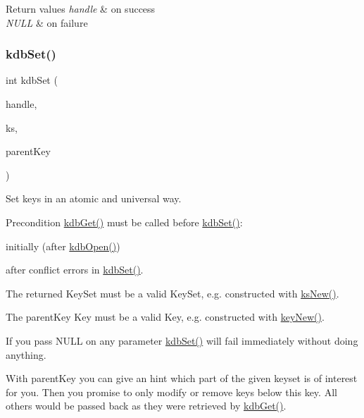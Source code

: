 \begin{DoxyRetVals}{Return values}
{\em handle} & on success \\
\hline
{\em N\+U\+LL} & on failure \\
\hline
\end{DoxyRetVals}
\mbox{\label{group__kdb_ga11436b058408f83d303ca5e996832bcf}} 
\subsubsection{\texorpdfstring{kdbSet()}{kdbSet()}}
{\footnotesize\ttfamily int kdb\+Set (\begin{DoxyParamCaption}\item[{K\+DB $\ast$}]{handle,  }\item[{Key\+Set $\ast$}]{ks,  }\item[{Key $\ast$}]{parent\+Key }\end{DoxyParamCaption})}



Set keys in an atomic and universal way. 

\begin{DoxyPrecond}{Precondition}
\mbox{\hyperlink{group__kdb_ga28e385fd9cb7ccfe0b2f1ed2f62453a1}{kdb\+Get()}} must be called before \mbox{\hyperlink{group__kdb_ga11436b058408f83d303ca5e996832bcf}{kdb\+Set()}}\+:
\begin{DoxyItemize}
\item initially (after \mbox{\hyperlink{group__kdb_ga6808defe5870f328dd17910aacbdc6ca}{kdb\+Open()}})
\item after conflict errors in \mbox{\hyperlink{group__kdb_ga11436b058408f83d303ca5e996832bcf}{kdb\+Set()}}.
\end{DoxyItemize}

The {\ttfamily returned} Key\+Set must be a valid Key\+Set, e.\+g. constructed with \mbox{\hyperlink{group__keyset_ga671e1aaee3ae9dc13b4834a4ddbd2c3c}{ks\+New()}}.

The {\ttfamily parent\+Key} Key must be a valid Key, e.\+g. constructed with \mbox{\hyperlink{group__key_gad23c65b44bf48d773759e1f9a4d43b89}{key\+New()}}.
\end{DoxyPrecond}
If you pass N\+U\+LL on any parameter \mbox{\hyperlink{group__kdb_ga11436b058408f83d303ca5e996832bcf}{kdb\+Set()}} will fail immediately without doing anything.

With {\ttfamily parent\+Key} you can give an hint which part of the given keyset is of interest for you. Then you promise to only modify or remove keys below this key. All others would be passed back as they were retrieved by \mbox{\hyperlink{group__kdb_ga28e385fd9cb7ccfe0b2f1ed2f62453a1}{kdb\+Get()}}.

